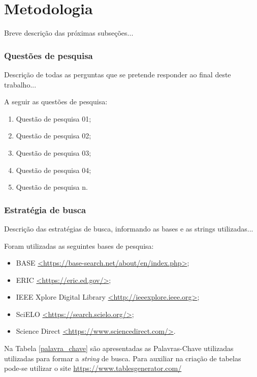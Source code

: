 \chapter{Metodologia}

Breve descrição das próximas subseções...

\subsection{Questões de pesquisa}

Descrição de todas as perguntas que se pretende responder ao final deste trabalho... 

A seguir as questões de pesquisa:
\begin{enumerate}
	\item Questão de pesquisa 01;
	\item Questão de pesquisa 02;
	\item Questão de pesquisa 03;
	\item Questão de pesquisa 04;
	\item Questão de pesquisa n.
\end{enumerate}

\subsection{Estratégia de busca}

Descrição das estratégias de busca, informando as bases e as strings utilizadas...

Foram utilizadas as seguintes bases de pesquisa:
\begin{itemize}
	\item BASE \url{<https://base-search.net/about/en/index.php>};
	\item ERIC	\url{<https://eric.ed.gov/>};
	\item IEEE Xplore Digital Library	\url{<http://ieeexplore.ieee.org>};
	\item SciELO	\url{<https://search.scielo.org/>};
	\item Science Direct	\url{<https://www.sciencedirect.com/>}.
\end{itemize}


Na Tabela \ref{palavra_chave} são apresentadas as Palavras-Chave utilizadas utilizadas para formar a \textit{string} de busca.
Para auxiliar na criação de tabelas pode-se utilizar o site \url{https://www.tablesgenerator.com/}

